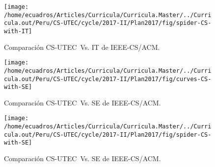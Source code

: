 \documentclass[a4paper,10pt]{book}
\begin{document}
\begin{figure}
\centering
	\texttt{[image: /home/ecuadros/Articles/Curricula/Curricula.Master/../Curricula.out/Peru/CS-UTEC/cycle/2017-II/Plan2017/fig/spider-CS-with-IT]}
	\caption{Comparaci\'on CS-UTEC~Vs. IT de IEEE-CS/ACM.}
	\label{fig:comparing-spider-CS-UTEC-with-IT}
\end{figure}

\begin{figure}
\centering
	\texttt{[image: /home/ecuadros/Articles/Curricula/Curricula.Master/../Curricula.out/Peru/CS-UTEC/cycle/2017-II/Plan2017/fig/curves-CS-with-SE]}
	\caption{Comparaci\'on CS-UTEC~Vs. SE de IEEE-CS/ACM.}
	\label{fig:comparing-curves-CS-UTEC-with-SE}
\end{figure}

\begin{figure}
\centering
	\texttt{[image: /home/ecuadros/Articles/Curricula/Curricula.Master/../Curricula.out/Peru/CS-UTEC/cycle/2017-II/Plan2017/fig/spider-CS-with-SE]}
	\caption{Comparaci\'on CS-UTEC~Vs. SE de IEEE-CS/ACM.}
	\label{fig:comparing-spider-CS-UTEC-with-SE}
\end{figure}
\end{document}
